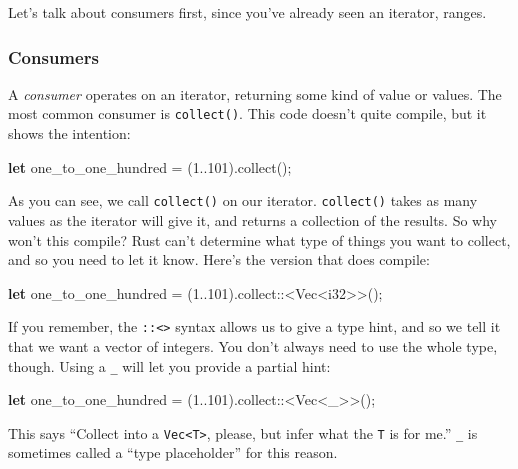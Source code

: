 \documentclass[a4paper,]{book}
\newenvironment{Shaded}{\begin{snugshade}}{\end{snugshade}}
\newcommand{\KeywordTok}[1]{\textcolor[rgb]{0.13,0.29,0.53}{\textbf{{#1}}}}
\newcommand{\DataTypeTok}[1]{\textcolor[rgb]{0.13,0.29,0.53}{{#1}}}
\newcommand{\DecValTok}[1]{\textcolor[rgb]{0.00,0.00,0.81}{{#1}}}
\newcommand{\NormalTok}[1]{{#1}}
\begin{document}
Let's talk about consumers first, since you've already seen an iterator,
ranges.

\subsubsection{Consumers}\label{consumers}

A \emph{consumer} operates on an iterator, returning some kind of value
or values. The most common consumer is \texttt{collect()}. This code
doesn't quite compile, but it shows the intention:

\begin{Shaded}
\begin{Highlighting}[]
\KeywordTok{let} \NormalTok{one_to_one_hundred = (}\DecValTok{1.}\NormalTok{.}\DecValTok{101}\NormalTok{).collect();}
\end{Highlighting}
\end{Shaded}

As you can see, we call \texttt{collect()} on our iterator.
\texttt{collect()} takes as many values as the iterator will give it,
and returns a collection of the results. So why won't this compile? Rust
can't determine what type of things you want to collect, and so you need
to let it know. Here's the version that does compile:

\begin{Shaded}
\begin{Highlighting}[]
\KeywordTok{let} \NormalTok{one_to_one_hundred = (}\DecValTok{1.}\NormalTok{.}\DecValTok{101}\NormalTok{).collect::<}\DataTypeTok{Vec}\NormalTok{<}\DataTypeTok{i32}\NormalTok{>>();}
\end{Highlighting}
\end{Shaded}

If you remember, the \texttt{::\textless{}\textgreater{}} syntax allows
us to give a type hint, and so we tell it that we want a vector of
integers. You don't always need to use the whole type, though. Using a
\texttt{\_} will let you provide a partial hint:

\begin{Shaded}
\begin{Highlighting}[]
\KeywordTok{let} \NormalTok{one_to_one_hundred = (}\DecValTok{1.}\NormalTok{.}\DecValTok{101}\NormalTok{).collect::<}\DataTypeTok{Vec}\NormalTok{<_>>();}
\end{Highlighting}
\end{Shaded}

This says ``Collect into a \texttt{Vec\textless{}T\textgreater{}},
please, but infer what the \texttt{T} is for me.'' \texttt{\_} is
sometimes called a ``type placeholder'' for this reason.
\end{document}
